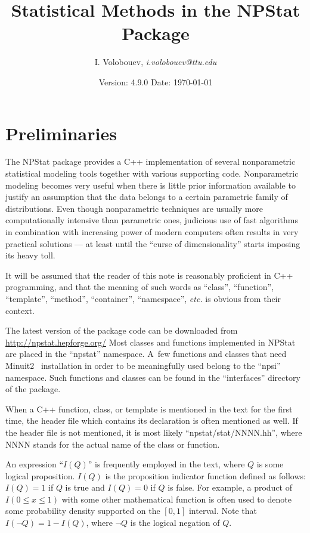 \documentclass[12pt,titlepage]{article}
\begin{document}
\title{Statistical Methods in the NPStat Package}
\author{I. Volobouev, {\it i.volobouev@ttu.edu}}
\date{Version: 4.9.0 \hspace{1.5cm} Date: \today}
\maketitle

\tableofcontents

\newpage
\section{Preliminaries}
\label{sec:preliminaries}

The NPStat package provides a C++ implementation of 
several nonparametric
statistical modeling tools together with
various supporting code. Nonparametric modeling becomes very
useful when there is little prior information available to justify an
assumption that the data belongs to a certain parametric family of
distributions. Even though nonparametric techniques are usually
more computationally intensive than parametric ones,
judicious use of fast algorithms in combination with
increasing power of modern computers often results in very practical
solutions --- at least until the ``curse of dimensionality'' starts
imposing its heavy toll.

It will be assumed that the reader of this note is reasonably
proficient in C++ programming, and that the meaning
of such words as ``class'', ``function'', ``template'',
``method'', ``container'', ``namespace'', {\it etc.}
is obvious from their context.

The latest version of the package code can be downloaded from
\href{http://npstat.hepforge.org/}{http://npstat.hepforge.org/}
Most classes and functions implemented in NPStat are placed in the 
``npstat'' namespace. A~few functions and classes that
need Minuit2~\cite{ref:minuit} installation
in order to be meaningfully used belong
to the ``npsi'' namespace. Such functions and
classes can be found in the ``interfaces''
directory of the package.

When a C++ function, class, or template is mentioned in the text
for the first time, the header file which contains its declaration
is often mentioned as well. If the header file is not mentioned,
it is most likely ``npstat/stat/NNNN.hh'', where NNNN stands
for the actual name of the class or function.

An expression ``$I(Q)$'' is frequently employed in the text,
where $Q$ is some logical proposition.
$I(Q)$ is the proposition indicator function
defined as follows: $I(Q) = 1$ if $Q$ is true
and $I(Q) = 0$ if $Q$ is false. For example, a product of $I(0 \le x \le 1)$
with some other mathematical function is often used to
denote some probability density supported
on the $[0, 1]$ interval. Note that $I(\neg Q) = 1 - I(Q)$, where 
$\neg Q$ is the logical negation of $Q$. 
\end{document}
